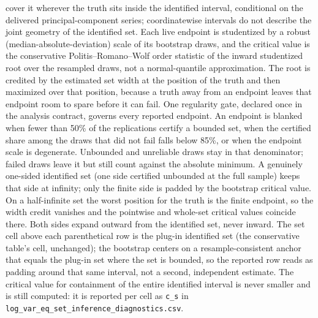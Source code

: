 \documentclass[11pt]{article}
\begin{document}
\begin{table}[!htbp]
\begin{threeparttable}
\begin{tablenotes}[flushleft]
cover it wherever the truth sits inside the identified interval, conditional on the delivered principal-component series; coordinatewise intervals do not describe the joint geometry of the identified set. Each live endpoint is studentized by a robust (median-absolute-deviation) scale of its bootstrap draws, and the critical value is the conservative Politis--Romano--Wolf order statistic of the inward studentized root over the resampled draws, not a normal-quantile approximation. The root is credited by the estimated set width at the position of the truth and then maximized over that position, because a truth away from an endpoint leaves that endpoint room to spare before it can fail. One regularity gate, declared once in the analysis contract, governs every reported endpoint. An endpoint is blanked when fewer than 50\% of the replications certify a bounded set, when the certified share among the draws that did not fail falls below 85\%, or when the endpoint scale is degenerate. Unbounded and unreliable draws stay in that denominator; failed draws leave it but still count against the absolute minimum. A genuinely one-sided identified set (one side certified unbounded at the full sample) keeps that side at infinity; only the finite side is padded by the bootstrap critical value. On a half-infinite set the worst position for the truth is the finite endpoint, so the width credit vanishes and the pointwise and whole-set critical values coincide there. Both sides expand outward from the identified set, never inward. The set cell above each parenthetical row is the plug-in identified set (the conservative table's cell, unchanged); the bootstrap centers on a resample-consistent anchor that equals the plug-in set where the set is bounded, so the reported row reads as padding around that same interval, not a second, independent estimate. The critical value for containment of the entire identified interval is never smaller and is still computed: it is reported per cell as \texttt{c\_s} in \texttt{log\_var\_eq\_set\_inference\_diagnostics.csv}.
\end{tablenotes}
\end{threeparttable}
\end{table}
\clearpage
\end{document}
